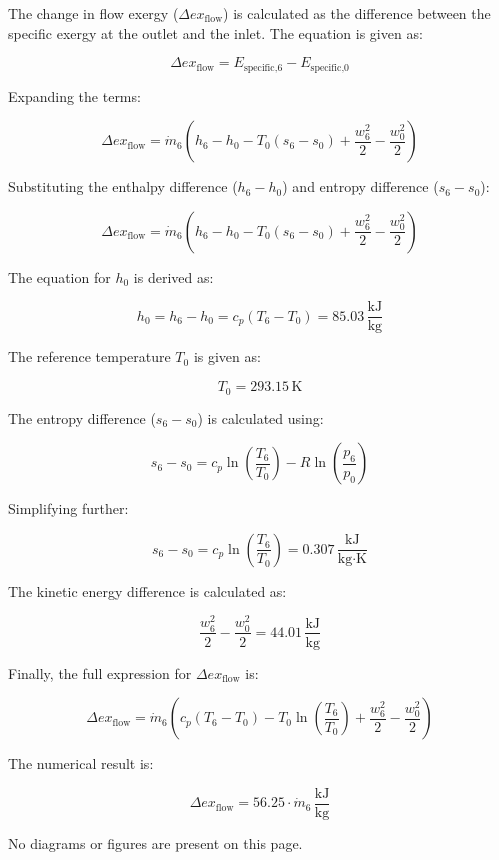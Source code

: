 The change in flow exergy (\( \Delta ex_{\text{flow}} \)) is calculated as the difference between the specific exergy at the outlet and the inlet. The equation is given as:  

\[
\Delta ex_{\text{flow}} = E_{\text{specific,6}} - E_{\text{specific,0}}
\]

Expanding the terms:  

\[
\Delta ex_{\text{flow}} = \dot{m}_6 \left( h_6 - h_0 - T_0 (s_6 - s_0) + \frac{w_6^2}{2} - \frac{w_0^2}{2} \right)
\]

Substituting the enthalpy difference (\( h_6 - h_0 \)) and entropy difference (\( s_6 - s_0 \)):  

\[
\Delta ex_{\text{flow}} = \dot{m}_6 \left( h_6 - h_0 - T_0 (s_6 - s_0) + \frac{w_6^2}{2} - \frac{w_0^2}{2} \right)
\]

The equation for \( h_0 \) is derived as:  

\[
h_0 = h_6 - h_0 = c_p (T_6 - T_0) = 85.03 \, \frac{\text{kJ}}{\text{kg}}
\]

The reference temperature \( T_0 \) is given as:  

\[
T_0 = 293.15 \, \text{K}
\]

The entropy difference (\( s_6 - s_0 \)) is calculated using:  

\[
s_6 - s_0 = c_p \ln \left( \frac{T_6}{T_0} \right) - R \ln \left( \frac{p_6}{p_0} \right)
\]

Simplifying further:  

\[
s_6 - s_0 = c_p \ln \left( \frac{T_6}{T_0} \right) = 0.307 \, \frac{\text{kJ}}{\text{kg·K}}
\]

The kinetic energy difference is calculated as:  

\[
\frac{w_6^2}{2} - \frac{w_0^2}{2} = 44.01 \, \frac{\text{kJ}}{\text{kg}}
\]

Finally, the full expression for \( \Delta ex_{\text{flow}} \) is:  

\[
\Delta ex_{\text{flow}} = \dot{m}_6 \left( c_p (T_6 - T_0) - T_0 \ln \left( \frac{T_6}{T_0} \right) + \frac{w_6^2}{2} - \frac{w_0^2}{2} \right)
\]

The numerical result is:  

\[
\Delta ex_{\text{flow}} = 56.25 \cdot \dot{m}_6 \, \frac{\text{kJ}}{\text{kg}}
\]  

No diagrams or figures are present on this page.